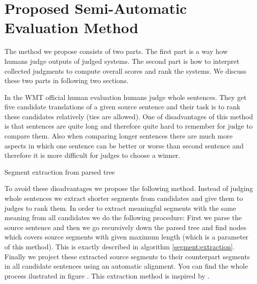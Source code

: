 \chapter{Proposed Semi-Automatic Evaluation Method}

The method we propose consists of two parts. The first part is a way how humans
judge outputs of judged systems. The second part is how to interpret collected
judgments to compute overall scores and rank the systems. We discuss these two
parts in following two sections. 

In the WMT official human evaluation humans judge whole sentences. They get
five candidate translations of a given source sentence and their task is to
rank these candidates relatively (ties are allowed). One of disadvantages of
this method is that sentences are quite long and therefore quite hard to
remember for judge to compare them. Also when comparing longer sentences there
are much more aspects in which one sentence can be better or worse than second
sentence and therefore it is more difficult for judges to choose a winner. 

\begin{algorithm}[H]
    \caption{Segment extraction from parsed tree}
    \label{segment:extraction}
\end{algorithm}

To avoid these disadvantages we propose the following method. Instead of
judging whole sentences we extract shorter segments from candidates and give
them to judges to rank them. In order to extract meaningful segments with the
same meaning from all candidates we do the following procedure: First we parse
the source sentence and then we go recursively down the parsed tree and find
nodes which covers source segments with given maximum length (which is a
parameter of this method). This is exactly described in algorithm
\ref{segment:extraction}. Finally we project these extracted source segments to
their counterpart segments in all candidate sentences using an automatic
alignment.  You can find the whole process ilustrated in figure .  This extraction method is inspired by .

